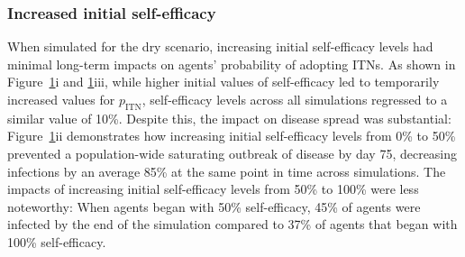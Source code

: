 \begin{figure}[hbt!]
     \centering
    \label{fig:ex3-p-itn}
\end{figure}

\subsubsection{Increased initial self-efficacy}

When simulated for the dry scenario, increasing initial self-efficacy levels had minimal long-term impacts on agents' probability of adopting ITNs. As shown in Figure~\ref{fig:ex3-p-itn}i and \ref{fig:ex3-p-itn}iii, while higher initial values of self-efficacy led to temporarily increased values for $p_{\text{ITN}}$, self-efficacy levels across all simulations regressed to a similar value of 10\%. Despite this, the impact on disease spread was substantial: Figure~\ref{fig:ex3-p-itn}ii demonstrates how increasing initial self-efficacy levels from 0\% to 50\% prevented a population-wide saturating outbreak of disease by day 75, decreasing infections by an average 85\% at the same point in time across simulations. The impacts of increasing initial self-efficacy levels from 50\% to 100\% were less noteworthy: When agents began with 50\% self-efficacy, 45\% of agents were infected by the end of the simulation compared to 37\% of agents that began with 100\% self-efficacy.

